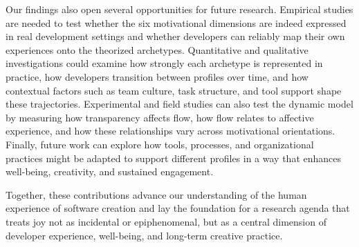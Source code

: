 \documentclass[12pt]{elsarticle}
\begin{document}
Our findings also open several opportunities for future research. Empirical
studies are needed to test whether the six motivational dimensions are indeed
expressed in real development settings and whether developers can reliably map
their own experiences onto the theorized archetypes. Quantitative and
qualitative investigations could examine how strongly each archetype is
represented in practice, how developers transition between profiles over time,
and how contextual factors such as team culture, task structure, and tool
support shape these trajectories. Experimental and field studies can also test
the dynamic model by measuring how transparency affects flow, how flow relates
to affective experience, and how these relationships vary across motivational
orientations. Finally, future work can explore how tools, processes, and
organizational practices might be adapted to support different profiles in a way
that enhances well-being, creativity, and sustained engagement.

Together, these contributions advance our understanding of the human experience
of software creation and lay the foundation for a research agenda that treats joy
not as incidental or epiphenomenal, but as a central dimension of developer
experience, well-being, and long-term creative practice.


\end{document}
